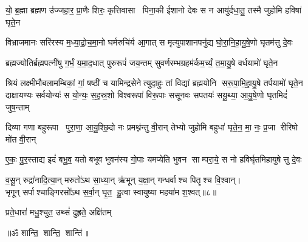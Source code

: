 

\twolineshloka
{यो॒ ब्र॒ह्मा ब्रह्मण उ॑ज्जहा॒र॒ प्रा॒णैः शिरः॒ कृत्तिवासा पिना॒की}
{ईशानो देवः स न आयु॑र्दधा॒तु॒ तस्मै जुहोमि हविषा॑ घृते॒न}

\twolineshloka
{विभ्राजमानः सरि॑रस्य म॒ध्या॒द्रो॒च॒मा॒नो घर्मरुचि॑र्य आ॒गात्}
{स मृत्युपाशानपनु॑द्य घो॒रा॒नि॒हा॒यु॒षे॒णो घृतम॑त्तु दे॒वः}

\twolineshloka
{ब्रह्मज्योतिर्ब्रह्मपत्नी॑षु  ग॒र्भं॒ य॒मा॒द॒धात् पुरुरूपं॑ जय॒न्तम्}
{सुवर्णरम्भग्रहम॑र्कम॒र्च्यं॒ त॒मा॒यु॒षे वर्धयामो॑ घृते॒न}

\twolineshloka
{श्रियं लक्ष्मीमौबलामम्बिकां॒ गां॒ षष्ठीं च यामिन्द्रसेनेत्युदा॒हुः}
{तां विद्यां ब्रह्मयोनि सरू॒पा॒मि॒हा॒यु॒षे तर्पयामो॑ घृते॒न}
\twolineshloka
{दाक्षायण्यः सर्वयोन्यः॑ स यो॒न्यः॒ स॒ह॒स्र॒शो विश्वरूपा॑ विरू॒पाः}
{ससूनवः सपतयः॑ सयू॒थ्या॒ आ॒यु॒षे॒णो घृतमिदं॑ जुष॒न्ताम्}

\twolineshloka
{दिव्या गणा बहुरूपा पुरा॒णा॒ आ॒यु॒श्छि॒दो नः प्रमथ्न॑न्तु वी॒रान्}
{तेभ्यो जुहोमि बहुधा॑ घृते॒न॒ मा॒ नः॒ प्र॒जा रीरिषो मो॑त वी॒रान्}

\twolineshloka
{ए॒कः॒ पु॒र॒स्ताद्य इदं॑ बभू॒व॒ यतो बभूव भुवन॑स्य गो॒पाः}
{यमप्येति भुवन साम्परा॒ये॒ स नो हविर्घृतमिहायुषेत्तु दे॒वः}

व॒सू॒न् रुद्रा॑नादि॒त्या॒न् मरुतो॑ऽथ सा॒ध्या॒न् ऋ॑भून् य॒क्षा॒न् गन्धर्वाश्च पितॄश्च वि॒श्वान्।\\
 भृगून् सर्पाश्चाङ्गिरसो॑ऽथ स॒र्वा॒न् घृ॒त॒ हु॒त्वा स्वायुष्या महया॑म श॒श्वत्॥८॥

{प्रते॒धारा॑ मधु॒श्चुत॒ उथ्सं॑ दुह्रते॒ अक्षि॑तम्}

\centerline{॥ॐ शान्ति॒ शान्ति॒ शान्ति॑॥}